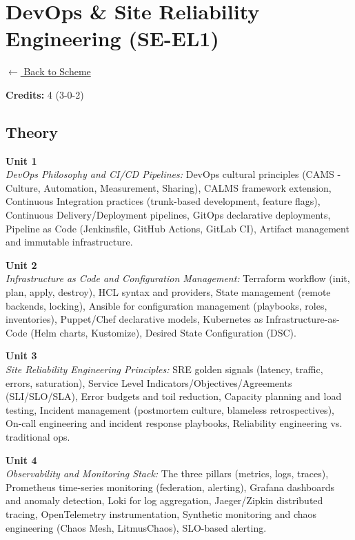 \section*{DevOps \& Site Reliability Engineering (SE-EL1)}
\label{elec:SE_1}

\noindent \small{\hyperref[main:scheme]{$\leftarrow$ Back to Scheme}} \vspace{0.5cm}

\noindent \textbf{Credits:} 4 (3-0-2)

\subsection*{Theory}
\noindent\textbf{Unit 1} \\
\textit{DevOps Philosophy and CI/CD Pipelines:} DevOps cultural principles (CAMS - Culture, Automation, Measurement, Sharing), CALMS framework extension, Continuous Integration practices (trunk-based development, feature flags), Continuous Delivery/Deployment pipelines, GitOps declarative deployments, Pipeline as Code (Jenkinsfile, GitHub Actions, GitLab CI), Artifact management and immutable infrastructure.

\vspace{0.3cm}

\noindent\textbf{Unit 2} \\
\textit{Infrastructure as Code and Configuration Management:} Terraform workflow (init, plan, apply, destroy), HCL syntax and providers, State management (remote backends, locking), Ansible for configuration management (playbooks, roles, inventories), Puppet/Chef declarative models, Kubernetes as Infrastructure-as-Code (Helm charts, Kustomize), Desired State Configuration (DSC).

\vspace{0.3cm}

\noindent\textbf{Unit 3} \\
\textit{Site Reliability Engineering Principles:} SRE golden signals (latency, traffic, errors, saturation), Service Level Indicators/Objectives/Agreements (SLI/SLO/SLA), Error budgets and toil reduction, Capacity planning and load testing, Incident management (postmortem culture, blameless retrospectives), On-call engineering and incident response playbooks, Reliability engineering vs. traditional ops.

\vspace{0.3cm}

\noindent\textbf{Unit 4} \\
\textit{Observability and Monitoring Stack:} The three pillars (metrics, logs, traces), Prometheus time-series monitoring (federation, alerting), Grafana dashboards and anomaly detection, Loki for log aggregation, Jaeger/Zipkin distributed tracing, OpenTelemetry instrumentation, Synthetic monitoring and chaos engineering (Chaos Mesh, LitmusChaos), SLO-based alerting.

